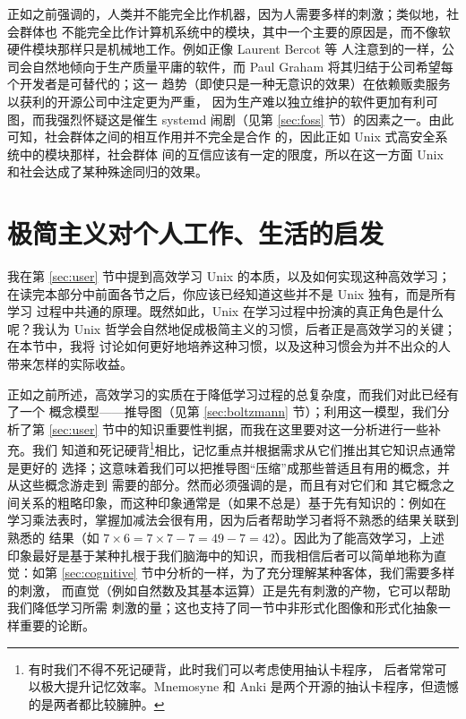 正如之前强调的，人类并不能完全比作机器，因为人需要多样的刺激；类似地，社会群体也
不能完全比作计算机系统中的模块，其中一个主要的原因是，而不像软硬件模块那样只是机械地工作。例如正像 Laurent Bercot 等
人注意到的一样，公司会自然地倾向于生产质量平庸的软件，而
Paul Graham 将其归结于公司希望每个开发者是可替代的；这一
趋势（即使只是一种无意识的效果）在依赖贩卖服务以获利的开源公司中注定更为严重，
因为生产难以独立维护的软件更加有利可图，而我强烈怀疑这是催生 systemd 闹剧（见第
\ref{sec:foss} 节）的因素之一。由此可知，社会群体之间的相互作用并不完全是合作
的，因此正如 Unix 式高安全系统中的模块那样，社会群体
间的互信应该有一定的限度，所以在这一方面 Unix 和社会达成了某种殊途同归的效果。

\section{极简主义对个人工作、生活的启发}\label{sec:worklife}

我在第 \ref{sec:user} 节中提到高效学习 Unix 的本质，以及如何实现这种高效学习；
在读完本部分中前面各节之后，你应该已经知道这些并不是 Unix 独有，而是所有学习
过程中共通的原理。既然如此，Unix 在学习过程中扮演的真正角色是什么呢？我认为
Unix 哲学会自然地促成极简主义的习惯，后者正是高效学习的关键；在本节中，我将
讨论如何更好地培养这种习惯，以及这种习惯会为并不出众的人带来怎样的实际收益。

正如之前所述，高效学习的实质在于降低学习过程的总复杂度，而我们对此已经有了一个
概念模型——推导图（见第 \ref{sec:boltzmann} 节）；利用这一模型，我们分析了第
\ref{sec:user} 节中的知识重要性判据，而我在这里要对这一分析进行一些补充。我们
知道和死记硬背\footnote{有时我们不得不死记硬背，此时我们可以考虑使用抽认卡程序，
后者常常可以极大提升记忆效率。Mnemosyne 和 Anki 是两个开源的抽认卡程序，但遗憾
的是两者都比较臃肿。}相比，记忆重点并根据需求从它们推出其它知识点通常是更好的
选择；这意味着我们可以把推导图“压缩”成那些普适且有用的概念，并从这些概念游走到
需要的部分。然而必须强调的是，而且有对它们和
其它概念之间关系的粗略印象，而这种印象通常是（如果不总是）基于先有知识的：例如在
学习乘法表时，掌握加减法会很有用，因为后者帮助学习者将不熟悉的结果关联到熟悉的
结果（如 $7 \times 6 = 7 \times 7 - 7 = 49 - 7 = 42$）。因此为了能高效学习，上述
印象最好是基于某种扎根于我们脑海中的知识，而我相信后者可以简单地称为直觉：如第
\ref{sec:cognitive} 节中分析的一样，为了充分理解某种客体，我们需要多样的刺激，
而直觉（例如自然数及其基本运算）正是先有刺激的产物，它可以帮助我们降低学习所需
刺激的量；这也支持了同一节中非形式化图像和形式化抽象一样重要的论断。

